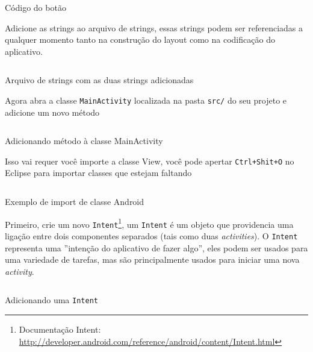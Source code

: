 \documentclass[a4paper,12pt,brazil,doubleside]{book}
\begin{document}
\begin{singlespace}
\begin{listing}[H]
\inputminted[linenos=true,fontsize=\small,frame=lines, framesep=2mm, tabsize=2,numbersep=5pt]{xml}{src/firstapp/2.xml}
\caption{Código do botão}
\end{listing}

Adicione as strings ao arquivo de strings, essas strings podem ser referenciadas a qualquer momento tanto na construção do layout como na codificação do aplicativo.

\begin{listing}
\inputminted[linenos=true,fontsize=\small,frame=lines, framesep=2mm, tabsize=2,numbersep=5pt]{xml}{src/firstapp/3.xml}
\caption{Arquivo de strings com as duas strings adicionadas}
\end{listing}

Agora abra a classe \texttt{MainActivity} localizada na pasta \texttt{\textcolor{mygreen}{src/}} do seu projeto e adicione um novo método

\begin{listing}
\inputminted[linenos=true,fontsize=\small,frame=lines, framesep=2mm, tabsize=2,numbersep=5pt]{java}{src/firstapp/4.java}
\caption{Adicionando método à classe MainActivity}
\end{listing}

\bi
\item{Isso vai requer você importe a classe View, você pode apertar \texttt{Ctrl+Shit+O} no Eclipse para importar classes que estejam faltando}
\ei

\begin{listing}
\inputminted[linenos=true,fontsize=\small,frame=lines, framesep=2mm, tabsize=2,numbersep=5pt]{java}{src/firstapp/4-2.java}
\caption{Exemplo de import de classe Android}
\end{listing}


Primeiro, crie um novo \texttt{Intent}\footnote{Documentação Intent: \href{http://developer.android.com/reference/android/content/Intent.html}{http://developer.android.com/reference/android/content/Intent.html}}, um \texttt{Intent} é um objeto que providencia uma ligação entre dois componentes separados (tais como duas \textit{activities}). O \texttt{Intent} representa uma ''intenção do aplicativo de fazer algo'', eles podem ser usados para uma variedade de tarefas, mas são principalmente usados para iniciar uma nova \emph{activity}.

\begin{listing}[H]
\inputminted[linenos=true,fontsize=\small,frame=lines, framesep=2mm, tabsize=2,numbersep=5pt]{java}{src/firstapp/5.java}
\caption{Adicionando uma \texttt{Intent}}
\end{listing}


\end{singlespace}
\end{document}
